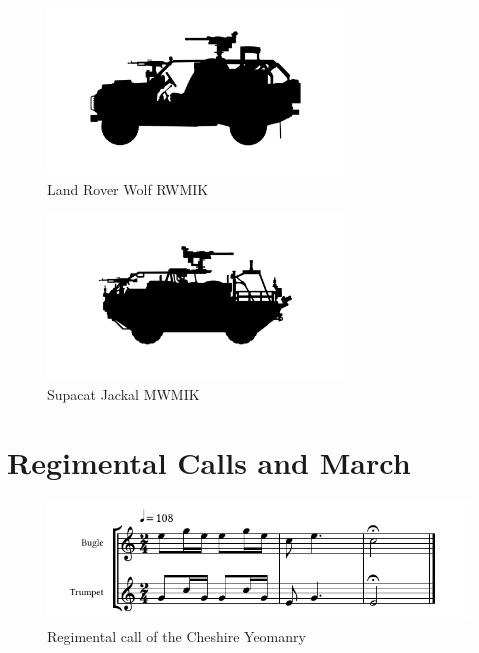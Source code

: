 \begin{figure}[h]
  \centering
  \includegraphics[width=0.7\textwidth]{platforms/wmik.pdf}
  \caption*{Land Rover Wolf RWMIK}
\end{figure}

\begin{figure}[h]
  \centering
  \includegraphics[width=0.7\textwidth]{platforms/jackal.pdf}
  \caption*{Supacat Jackal MWMIK}
\end{figure}

\chapter{Regimental Calls and March}

\begin{figure}[h]
  \centering
  \includegraphics[width=\textwidth]{gazette/cheshire-yeomanry-call.pdf}
  \caption*{Regimental call of the Cheshire Yeomanry~\cite[p11]{trumpet-and-bugle-calls}}
\end{figure}

\vspace{10mm}

